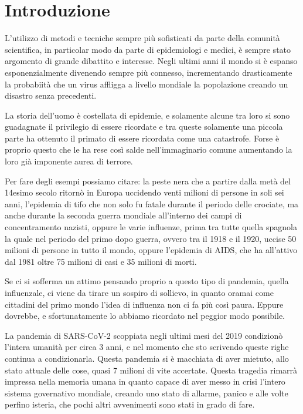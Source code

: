 \section{Introduzione}

L’utilizzo di metodi e tecniche sempre più sofisticati 
da parte della comunità scientifica, in particolar modo 
da parte di epidemiologi e medici, è sempre stato argomento 
di grande dibattito e interesse. Negli ultimi anni il mondo 
si è espanso esponenzialmente divenendo sempre più connesso,
incrementando drasticamente la probabiità che un virus 
affligga a livello mondiale la popolazione creando un 
disastro senza precedenti. 

La storia dell’uomo è costellata di epidemie, e solamente 
alcune tra loro si sono guadagnate il privilegio di essere 
ricordate e tra queste solamente una piccola parte ha ottenuto 
il primato di essere ricordata come una catastrofe. Forse 
è proprio questo che le ha rese così salde nell'immaginario 
comune aumentando la loro già imponente aurea di terrore.

Per fare degli esempi possiamo citare: la peste nera
 che a partire dalla 
metà del 14esimo secolo ritornò in Europa
uccidendo venti milioni di persone in soli sei anni, 
l'epidemia di tifo 
che non solo fu fatale durante il periodo delle crociate, 
ma anche durante la seconda guerra mondiale all'interno 
dei campi di concentramento nazisti, oppure le varie 
influenze, prima tra tutte quella spagnola 
la quale nel periodo del primo dopo guerra, ovvero tra il 
1918 e il 1920, uccise 50 milioni di persone in tutto il mondo, 
oppure l'epidemia di AIDS, 
che ha all'attivo dal 1981 oltre 75 milioni di casi e 35 milioni di morti.

Se ci si sofferma un attimo pensando proprio a questo tipo 
di pandemia, quella influenzale, ci viene da tirare un 
sospiro di sollievo, in quanto oramai come cittadini del 
primo mondo l'idea di influenza non ci fa più così paura.
Eppure dovrebbe, e sfortunatamente lo abbiamo ricordato 
nel peggior modo possibile. 

La pandemia di SARS-CoV-2  
scoppiata negli ultimi mesi del 2019 condizionò 
l’intera umanità per circa 3 anni, e nel momento che sto 
scrivendo queste righe continua a condizionarla. 
Questa pandemia si è macchiata di aver mietuto, 
allo stato attuale delle cose, quasi 7 milioni di vite accertate. 
Questa tragedia rimarrà impressa nella memoria umana 
in quanto capace di aver messo in crisi l'intero sistema
governativo mondiale, creando uno stato di allarme, panico e 
alle volte perfino isteria, che pochi altri avvenimenti 
sono stati in grado di fare. 

